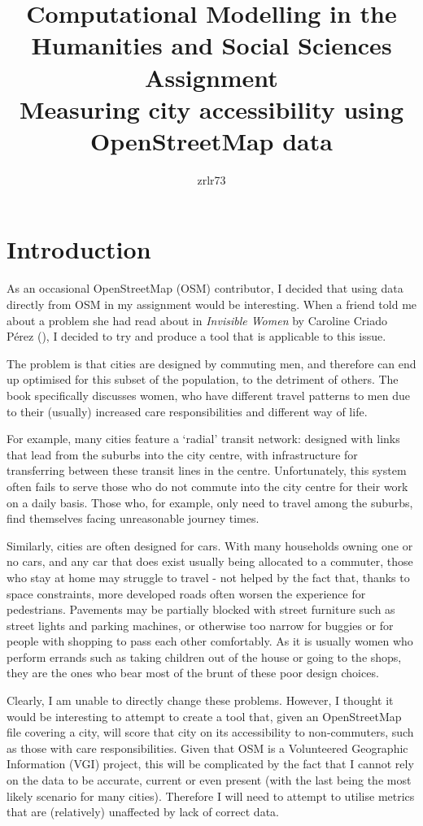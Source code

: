 \documentclass[12pt]{article} %
\title{\vspace{-1.6cm}Computational Modelling in the Humanities and Social Sciences Assignment \\
	\vspace{0.5cm}\large Measuring city accessibility using OpenStreetMap data\vspace{-0.3cm}}
\author{zrlr73}
\date{} %
\begin{document}
\maketitle

\section{Introduction}

As an occasional OpenStreetMap (OSM) contributor, I decided that using data directly from OSM in my assignment would be interesting. When a friend told me about a problem she had read about in \textit{Invisible Women} by Caroline Criado Pérez (\cite{Perez2019}), I decided to try and produce a tool that is applicable to this issue.

The problem is that cities are designed by commuting men, and therefore can end up optimised for this subset of the population, to the detriment of others. The book specifically discusses women, who have different travel patterns to men due to their (usually) increased care responsibilities and different way of life.

For example, many cities feature a `radial' transit network: designed with links that lead from the suburbs into the city centre, with infrastructure for transferring between these transit lines in the centre. Unfortunately, this system often fails to serve those who do not commute into the city centre for their work on a daily basis. Those who, for example, only need to travel among the suburbs, find themselves facing unreasonable journey times.

Similarly, cities are often designed for cars. With many households owning one or no cars, and any car that does exist usually being allocated to a commuter, those who stay at home may struggle to travel - not helped by the fact that, thanks to space constraints, more developed roads often worsen the experience for pedestrians. Pavements may be partially blocked with street furniture such as street lights and parking machines, or otherwise too narrow for buggies or for people with shopping to pass each other comfortably. As it is usually women who perform errands such as taking children out of the house or going to the shops, they are the ones who bear most of the brunt of these poor design choices.

Clearly, I am unable to directly change these problems. However, I thought it would be interesting to attempt to create a tool that, given an OpenStreetMap file covering a city, will score that city on its accessibility to non-commuters, such as those with care responsibilities. Given that OSM is a Volunteered Geographic Information (VGI) project, this will be complicated by the fact that I cannot rely on the data to be accurate, current or even present (with the last being the most likely scenario for many cities). Therefore I will need to attempt to utilise metrics that are (relatively) unaffected by lack of correct data.
\end{document}
